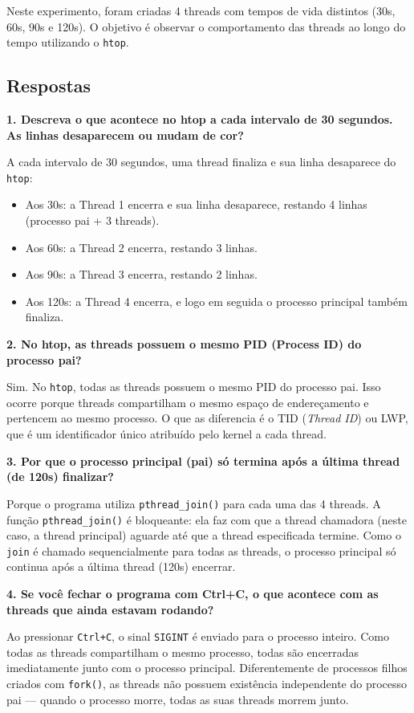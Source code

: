 \documentclass[11pt]{ifscarticle}
\begin{document}
    Neste experimento, foram criadas 4 threads com tempos de vida distintos (30s, 60s, 90s e 120s). O objetivo é observar o comportamento das threads ao longo do tempo utilizando o \texttt{htop}.

    \subsection{Respostas}

    \textbf{1. Descreva o que acontece no htop a cada intervalo de 30 segundos. As linhas desaparecem ou mudam de cor?}

    A cada intervalo de 30 segundos, uma thread finaliza e sua linha desaparece do \texttt{htop}:
    \begin{itemize}
        \item Aos 30s: a Thread 1 encerra e sua linha desaparece, restando 4 linhas (processo pai + 3 threads).
        \item Aos 60s: a Thread 2 encerra, restando 3 linhas.
        \item Aos 90s: a Thread 3 encerra, restando 2 linhas.
        \item Aos 120s: a Thread 4 encerra, e logo em seguida o processo principal também finaliza.
    \end{itemize}

    \textbf{2. No htop, as threads possuem o mesmo PID (Process ID) do processo pai?}

    Sim. No \texttt{htop}, todas as threads possuem o mesmo PID do processo pai. Isso ocorre porque threads compartilham o mesmo espaço de endereçamento e pertencem ao mesmo processo. O que as diferencia é o TID (\textit{Thread ID}) ou LWP, que é um identificador único atribuído pelo kernel a cada thread.

    \textbf{3. Por que o processo principal (pai) só termina após a última thread (de 120s) finalizar?}

    Porque o programa utiliza \texttt{pthread\_join()} para cada uma das 4 threads. A função \texttt{pthread\_join()} é bloqueante: ela faz com que a thread chamadora (neste caso, a thread principal) aguarde até que a thread especificada termine. Como o \texttt{join} é chamado sequencialmente para todas as threads, o processo principal só continua após a última thread (120s) encerrar.

    \textbf{4. Se você fechar o programa com Ctrl+C, o que acontece com as threads que ainda estavam rodando?}

    Ao pressionar \texttt{Ctrl+C}, o sinal \texttt{SIGINT} é enviado para o processo inteiro. Como todas as threads compartilham o mesmo processo, todas são encerradas imediatamente junto com o processo principal. Diferentemente de processos filhos criados com \texttt{fork()}, as threads não possuem existência independente do processo pai --- quando o processo morre, todas as suas threads morrem junto.
\end{document}
